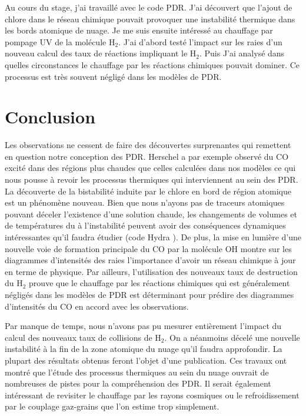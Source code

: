 \documentclass[11pt,a4paper,twoside,openright]{article}
\begin{document}
\begin{spacing}{0.98}
Au cours du stage, j'ai travaillé avec le code PDR. J'ai découvert que l'ajout de chlore dans le réseau chimique pouvait provoquer une instabilité thermique dans les bords atomique de nuage. Je me suis ensuite intéressé au chauffage par pompage UV de la molécule $\mathrm{H}_2$. J'ai d'abord testé l'impact sur les raies d'un nouveau calcul des taux de réactions impliquant le $\mathrm{H}_2$. Puis J'ai analysé dans quelles circonstances le chauffage par les réactions chimiques pouvait dominer. Ce processus est très souvent négligé dans les modèles de PDR. 








\setcounter{secnumdepth}{4}
\clearpage

\clearpage


\setcounter{secnumdepth}{-1}
\clearpage
\part{Conclusion}

Les observations ne cessent de faire des découvertes surprenantes qui remettent en question notre conception des PDR. Herschel a par exemple observé du $\mathrm{CO}$ excité dans des régions plus chaudes que celles calculées dans nos modèles ce qui nous pousse à revoir les processus thermiques qui interviennent au sein des PDR. La découverte de la bistabilité induite par le chlore en bord de région atomique est un phénomène nouveau. Bien que nous n'ayons pas de traceurs atomiques pouvant déceler l'existence d'une solution chaude, les changements de volumes et de températures du à l'instabilité peuvent avoir des conséquences dynamiques intéressantes qu'il faudra étudier (code Hydra \cite{Bron2018}). De plus, la mise en lumière d'une nouvelle voie de formation principale du $\mathrm{CO}$ par la molécule $\mathrm{OH}$ montre sur les diagrammes d'intensités des raies l'importance d'avoir un réseau chimique à jour en terme de physique. Par ailleurs, l'utilisation des nouveaux taux de destruction du $\mathrm{H}_2$ prouve que le chauffage par les réactions chimiques qui est généralement négligés dans les modèles de PDR est déterminant pour prédire des diagrammes d'intensités du $\mathrm{CO}$ en accord avec les observations. \newline 

Par manque de temps, nous n'avons pas pu mesurer entièrement l'impact du calcul des nouveaux taux de collisions de $\mathrm{H}_2$. On a néanmoins décelé une nouvelle instabilité à la fin de la zone atomique du nuage qu'il faudra approfondir. La plupart des résultats obtenus feront l'objet d'une publication. Ces travaux ont montré que l'étude des processus thermiques au sein du nuage ouvrait de nombreuses de pistes pour la compréhension des PDR. Il serait également intéressant de revisiter le chauffage par les rayons cosmiques ou le refroidissement par le couplage gaz-grains que l'on estime trop simplement. 

\clearpage



\clearpage
\setcounter{secnumdepth}{4}





\end{spacing}
\end{document}
